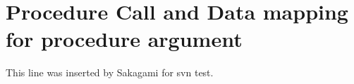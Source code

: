 \chapter{Procedure Call and Data mapping for procedure argument}

This line was inserted by Sakagami for svn test.

